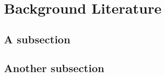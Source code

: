 \section{Background Literature}

\lipsum[4]

\subsection{A subsection} 

\lipsum[5]

\subsection{Another subsection}

\lipsum[5]

\lipsum[8] \\